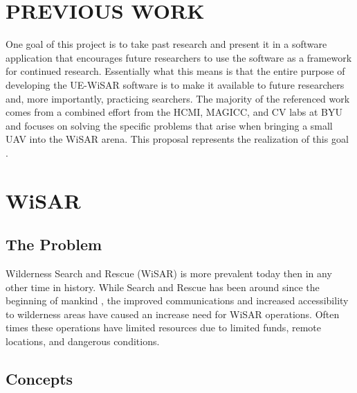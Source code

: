 \documentclass[12pt]{IEEEtran}
\begin{document}
\section{PREVIOUS WORK}
One goal of this project is to take past research and present it in a software
application that encourages future researchers to use the software as a
framework for continued research.  Essentially what this means is that the
entire purpose of developing the UE-WiSAR software is to make it available
to future researchers and, more importantly, practicing searchers.  The majority
of the referenced work comes from a combined effort from the HCMI, MAGICC, and CV labs at BYU and focuses on solving
the specific problems that arise when bringing a small UAV into the WiSAR arena.
This proposal represents the realization of this goal
\cite{lin2010supporting}.
  
  
\section{WiSAR}
\subsection{The Problem}
Wilderness Search and Rescue (WiSAR) is more prevalent today then in any other
time in history.  While Search and Rescue has been around since the beginning of
mankind \cite[p.~13]{setnicka1980}, the improved communications and increased
accessibility to wilderness areas have caused an increase need for WiSAR
operations.  Often times these operations have limited resources due to limited
funds, remote locations, and dangerous conditions.


\subsection{Concepts}
\end{document}
